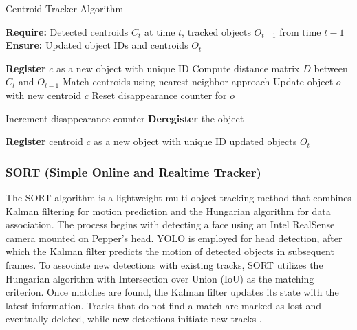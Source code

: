 \documentclass{CSSRforAfrica}
\begin{document}
\begin{algorithm}
	\caption{Centroid Tracker Algorithm}
	\textbf{Require:} Detected centroids $C_t$ at time $t$, tracked objects $O_{t-1}$ from time $t-1$ \\
	\textbf{Ensure:} Updated object IDs and centroids $O_t$
	\begin{algorithmic}[1]
		\State \textbf{Register} $c$ as a new object with unique ID
		\EndFor
		\Else
		\State Compute distance matrix $D$ between $C_t$ and $O_{t-1}$
		\State Match centroids using nearest-neighbor approach
		\State Update object $o$ with new centroid $c$
		\State Reset disappearance counter for $o$
		\EndFor
		
		\State Increment disappearance counter
		\State \textbf{Deregister} the object
		\EndIf
		\EndFor
		
		\State \textbf{Register} centroid $c$ as a new object with unique ID
		\EndFor
		\EndIf
		\State \Return updated objects $O_t$
	\end{algorithmic}
\end{algorithm}

\subsubsection*{SORT (Simple Online and Realtime Tracker)}
The SORT algorithm is a lightweight multi-object tracking method that combines Kalman filtering for motion prediction and the Hungarian algorithm for data association. The process begins with detecting a face using an Intel RealSense camera mounted on Pepper's head. YOLO is employed for head detection, after which the Kalman filter predicts the motion of detected objects in subsequent frames. To associate new detections with existing tracks, SORT utilizes the Hungarian algorithm with Intersection over Union (IoU) as the matching criterion. Once matches are found, the Kalman filter updates its state with the latest information. Tracks that do not find a match are marked as lost and eventually deleted, while new detections initiate new tracks \cite{SORT}.

\newpage
\end{document}
